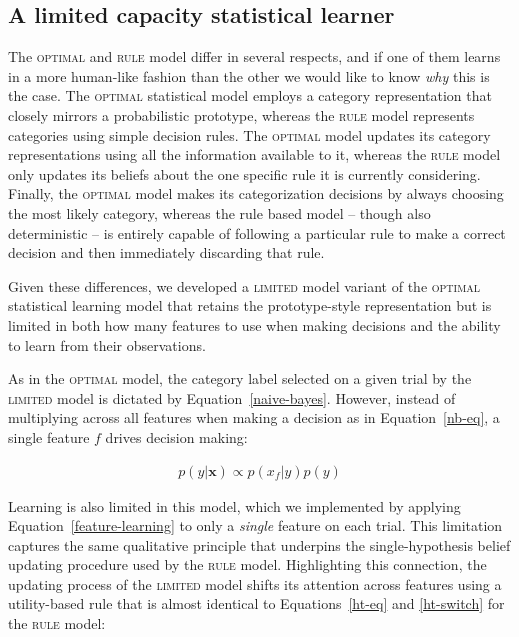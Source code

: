 \documentclass[a4paper, doc, floatsintext]{apa6}
\begin{document}
\subsection{A limited capacity statistical learner}

The \textsc{optimal} and \textsc{rule} model differ in several respects, and if one of them learns in a more human-like fashion than the other we would like to know \textit{why} this is the case. The \textsc{optimal} statistical model employs a category representation that closely mirrors a probabilistic prototype, whereas the \textsc{rule} model represents categories using simple decision rules. The \textsc{optimal} model updates its category representations using all the information available to it, whereas the \textsc{rule} model only updates its beliefs about the one specific rule it is currently considering. Finally, the \textsc{optimal} model makes its categorization decisions by always choosing the most likely category, whereas the rule based model -- though also deterministic -- is entirely capable of following a particular rule to make a correct decision and then immediately discarding that rule.

Given these differences, we developed a \textsc{limited} model variant of the \textsc{optimal} statistical learning model that retains the prototype-style representation but is limited in both how many features to use when making decisions and the ability to learn from their observations. %

As in the \textsc{optimal} model, the category label selected on a given trial by the \textsc{limited} model is dictated by Equation~\ref{naive-bayes}. However, instead of multiplying across all features when making a decision as in Equation~\ref{nb-eq}, a single feature $f$ drives decision making:

\begin{align}
p(y|\textbf{x}) \propto  p(x_{f}|y)p(y)
\label{limited-prototype-eq}
\end{align}

Learning is also limited in this model, which we implemented by applying Equation~\ref{feature-learning} to only a \textit{single} feature on each trial. This limitation captures the same qualitative principle that underpins the single-hypothesis belief updating procedure used by the \textsc{rule} model. Highlighting this connection, the updating process of the \textsc{limited} model shifts its attention across features using a utility-based rule that is almost identical to Equations~\ref{ht-eq} and \ref{ht-switch} for the \textsc{rule} model:
\end{document}
